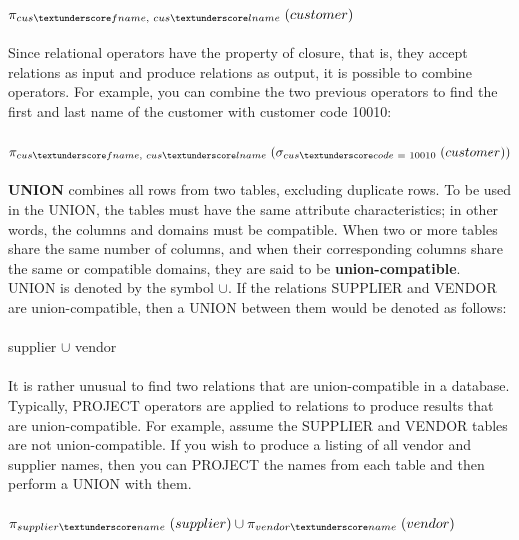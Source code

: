 \documentclass[a4paper, 12pt, titlepage]{report}
\begin{document}
{\(\pi_{cus\textunderscore fname, \hspace{0.1cm}cus\textunderscore lname} \hspace{0.1cm} (customer)\)\\ \\
Since relational operators have the property of closure, that is, they accept relations as input and produce relations as output, it is possible to combine operators. For example, you can combine the two previous operators to find the first and last name of the customer with customer code 10010:\\ \\
$\pi_{cus\textunderscore fname,\hspace{0.1cm} cus\textunderscore lname} \hspace{0.1cm}(\sigma_{cus\textunderscore code \hspace{0.1cm}= \hspace{0.1cm}10010} \hspace{0.1cm}(customer))$ \\ \\
\textbf{UNION} combines all rows from two tables, excluding duplicate rows. To be used in the UNION, the tables must have the same attribute characteristics; in other words, the columns and domains must be compatible. When two or more tables share the same
number of columns, and when their corresponding columns share the same or compatible domains, they are said to be \textbf{union-compatible}. UNION is denoted by the symbol $\cup$. If the relations SUPPLIER and VENDOR are union-compatible, then a UNION between them would be denoted as follows:\\ \\
supplier $\cup$ vendor \\ \\
It is rather unusual to find two relations that are union-compatible in a database. Typically, PROJECT operators are applied to relations to produce results that are union-compatible. For example, assume the SUPPLIER and VENDOR tables are not union-compatible. If you wish to produce a listing of all vendor and supplier names, then you can PROJECT the names from each table and then perform a UNION with them.\\ \\
$\pi_{supplier\textunderscore name} \hspace{0.1cm} (supplier) \cup \pi_{vendor\textunderscore name} \hspace{0.1cm} (vendor)$ \\ \\
}
\end{document}
